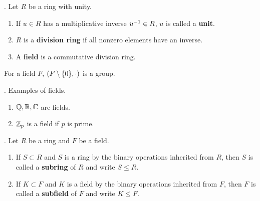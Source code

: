. Let \(R\) be a ring with unity.
\begin{enumerate}
    \item {} If \(u \in R\) has a multiplicative inverse \(u ^{-1} \in R\), \(u\) is called a \textbf{unit}.
    \item {} \(R\) is a \textbf{division ring} if all nonzero elements have an inverse.
    \item {} A \textbf{field} is a commutative division ring.
\end{enumerate}

\rmk For a field \(F\), \((F \setminus \{0\}, \cdot)\) is a group.

\ex. Examples of fields.
\begin{enumerate}
    \item \(\mathbb{Q}, \mathbb{R}, \mathbb{C}\) are fields.
    \item \(\mathbb{Z}_p\) is a field if \(p\) is prime.
\end{enumerate}

. Let \(R\) be a ring and \(F\) be a field.
\begin{enumerate}
    \item {} If \(S \subset R\) and \(S\) is a ring by the binary operations inherited from \(R\), then \(S\) is called a \textbf{subring} of \(R\) and write \(S \leq R\).
    \item {} If \(K \subset F\) and \(K\) is a field by the binary operations inherited from \(F\), then \(F\) is called a \textbf{subfield} of \(F\) and write \(K \leq F\).
\end{enumerate}

\smallskip
